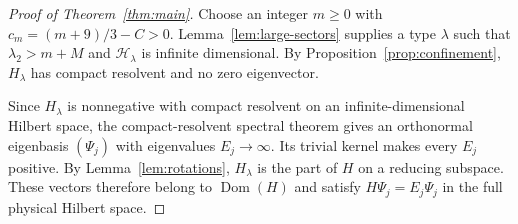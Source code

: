 \documentclass[11pt]{amsart}
\newcommand{\Hphys}{\mathcal H}
\newcommand{\Dom}{\operatorname{Dom}}
\theoremstyle{remark}
\numberwithin{equation}{section}
\begin{document}
\begin{proof}[Proof of Theorem~\ref{thm:main}]
Choose an integer $m\geq0$ with $c_m=(m+9)/3-C>0$.
Lemma~\ref{lem:large-sectors} supplies a type $\lambda$ such that
$\lambda_2>m+M$ and $\Hphys_\lambda$ is infinite dimensional.
By Proposition~\ref{prop:confinement}, $H_\lambda$ has compact
resolvent and no zero eigenvector.

Since $H_\lambda$ is nonnegative with compact resolvent on an
infinite-dimensional Hilbert space, the compact-resolvent spectral
theorem gives an orthonormal eigenbasis $(\Psi_j)$ with eigenvalues
$E_j\to\infty$. Its trivial kernel makes every $E_j$ positive.
By Lemma~\ref{lem:rotations}, $H_\lambda$ is the part of $H$ on a
reducing subspace. These vectors therefore belong to $\Dom(H)$ and
satisfy $H\Psi_j=E_j\Psi_j$ in the full physical Hilbert space.
\end{proof}
\end{document}
